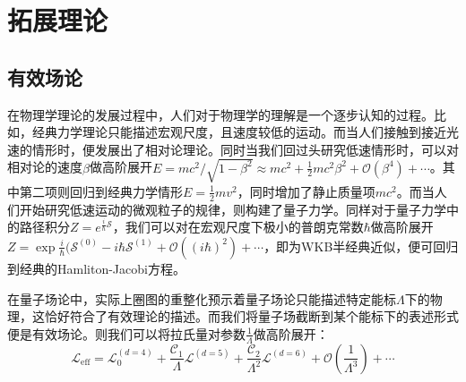 \epigraphhead[650]{}
\part{拓展理论}
\chapter{有效场论}
在物理学理论的发展过程中，人们对于物理学的理解是一个逐步认知的过程。比如，经典力学理论只能描述宏观尺度，且速度较低的运动。而当人们接触到接近光速的情形时，便发展出了相对论理论。同时当我们回过头研究低速情形时，可以对相对论的速度$\beta$做高阶展开$E=mc^2/\sqrt{1-\beta^2}\approx mc^2 + \frac{1}{2}mc^2 \beta^2+\mathcal{O}(\beta^4)+\cdots$。其中第二项则回归到经典力学情形$E=\frac{1}{2}mv^2$，同时增加了静止质量项$mc^2$。而当人们开始研究低速运动的微观粒子的规律，则构建了量子力学。同样对于量子力学中的路径积分$Z = e^{\frac{i}{\hbar}\mathcal{S}}$，我们可以对在宏观尺度下极小的普朗克常数$\hbar$做高阶展开$Z = \exp{\frac{i}{\hbar}(\mathcal{S}^{(0)} - i\hbar \mathcal{S}^{(1)} + \mathcal{O}((i\hbar)^2)+\cdots}$，即为WKB半经典近似，便可回归到经典的Hamliton-Jacobi方程。



在量子场论中，实际上圈图的重整化预示着量子场论只能描述特定能标$\Lambda$下的物理，这恰好符合了有效理论的描述。而我们将量子场截断到某个能标下的表述形式便是有效场论。则我们可以将拉氏量对参数$\frac{1}{\Lambda}$做高阶展开：
\begin{equation}
    \mathscr{L}_\mathrm{eff} =\mathscr{L}_0^{(d=4)}+\frac{\mathcal{C}_1}{\Lambda} \mathscr{L}^{(d=5)}+\frac{\mathcal{C}_2}{\Lambda^2} \mathscr{L}^{(d=6)}+\mathcal{O}(\frac{1}{\Lambda^3})+\cdots
\end{equation}
